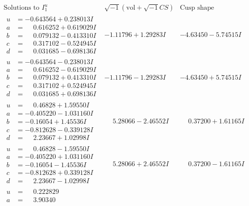\documentclass[1p]{elsarticle_modified}
\theoremstyle{definition}
\newcommand{\I}{\sqrt{-1}}
\begin{document}
$$\begin{array}{c|c|c}  
\text{Solutions to }I^u_{1}& \I (\text{vol} + \sqrt{-1}CS) & \text{Cusp shape}\\
 \hline 
\begin{aligned}
u &= -0.643564 + 0.238013 I \\
a &= \phantom{-}0.616252 + 0.619029 I \\
b &= \phantom{-}0.079132 - 0.413310 I \\
c &= \phantom{-}0.317102 - 0.524945 I \\
d &= \phantom{-}0.031685 - 0.698136 I\end{aligned}
 & -1.11796 + 1.29283 I & -4.63450 - 5.74515 I \\ \hline\begin{aligned}
u &= -0.643564 - 0.238013 I \\
a &= \phantom{-}0.616252 - 0.619029 I \\
b &= \phantom{-}0.079132 + 0.413310 I \\
c &= \phantom{-}0.317102 + 0.524945 I \\
d &= \phantom{-}0.031685 + 0.698136 I\end{aligned}
 & -1.11796 - 1.29283 I & -4.63450 + 5.74515 I \\ \hline\begin{aligned}
u &= \phantom{-}0.46828 + 1.59550 I \\
a &= -0.405220 - 1.031160 I \\
b &= -0.16054 + 1.45536 I \\
c &= -0.812628 - 0.339128 I \\
d &= \phantom{-}2.23667 + 1.02998 I\end{aligned}
 & \phantom{-}5.28066 - 2.46552 I & \phantom{-}0.37200 + 1.61165 I \\ \hline\begin{aligned}
u &= \phantom{-}0.46828 - 1.59550 I \\
a &= -0.405220 + 1.031160 I \\
b &= -0.16054 - 1.45536 I \\
c &= -0.812628 + 0.339128 I \\
d &= \phantom{-}2.23667 - 1.02998 I\end{aligned}
 & \phantom{-}5.28066 + 2.46552 I & \phantom{-}0.37200 - 1.61165 I \\ \hline\begin{aligned}
u &= \phantom{-}0.222829\phantom{ +0.000000I} \\
a &= \phantom{-}3.90340\phantom{ +0.000000I} \\

\end{aligned}
\end{array}$$
\end{document}
